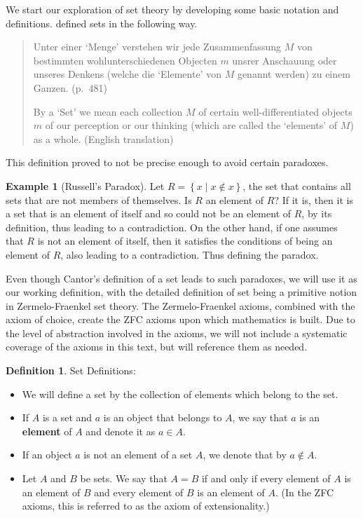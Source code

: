 \documentclass[
]{book}
\theoremstyle{definition}
\newtheorem{definition}{Definition}[chapter]
\theoremstyle{definition}
\newtheorem{example}{Example}[chapter]
\theoremstyle{definition}
\theoremstyle{definition}
\theoremstyle{remark}
\begin{document}
We start our exploration of set theory by developing some basic notation and definitions. \citet{Cantor} defined sets in the following way.

\begin{quote}
Unter einer `Menge' verstehen wir jede Zusammenfassung \(M\) von bestimmten wohlunterschiedenen Objecten \(m\) unsrer Anschauung oder unseres Denkens (welche die `Elemente' von \(M\) genannt werden) zu einem Ganzen. (p.~481)

By a `Set' we mean each collection \(M\) of certain well-differentiated objects \(m\) of our perception or our thinking (which are called the `elements' of \(M\)) as a whole. (English translation)
\end{quote}

This definition proved to not be precise enough to avoid certain paradoxes.

\begin{example}[Russell's Paradox]
Let \(R= \left\{ x \middle \vert x\notin x\right\}\), the set that contains all sets that are not members of themselves. Is \(R\) an element of \(R\)? If it is, then it is a set that is an element of itself and so could not be an element of \(R\), by its definition, thus leading to a contradiction. On the other hand, if one assumes that \(R\) is not an element of itself, then it satisfies the conditions of being an element of \(R\), also leading to a contradiction. Thus defining the paradox.
\end{example}

Even though Cantor's definition of a set leads to such paradoxes, we will use it as our working definition, with the detailed definition of set being a primitive notion in Zermelo-Fraenkel set theory. The Zermelo-Fraenkel axioms, combined with the axiom of choice, create the ZFC axioms upon which mathematics is built. Due to the level of abstraction involved in the axioms, we will not include a systematic coverage of the axioms in this text, but will reference them as needed.

\begin{definition}

Set Definitions:

\begin{itemize}
\item
  We will define a set by the collection of elements which belong to the set.
\item
  If \(A\) is a set and \(a\) is an object that belongs to \(A\), we say that \(a\) is an \textbf{element} of \(A\) and denote it as \(a\in A\).
\item
  If an object \(a\) is not an element of a set \(A\), we denote that by \(a \notin A\).
\item
  Let \(A\) and \(B\) be sets. We say that \(A=B\) if and only if every element of \(A\) is an element of \(B\) and every element of \(B\) is an element of \(A\). (In the ZFC axioms, this is referred to as the axiom of extensionality.)
\end{itemize}

\end{definition}
\end{document}
